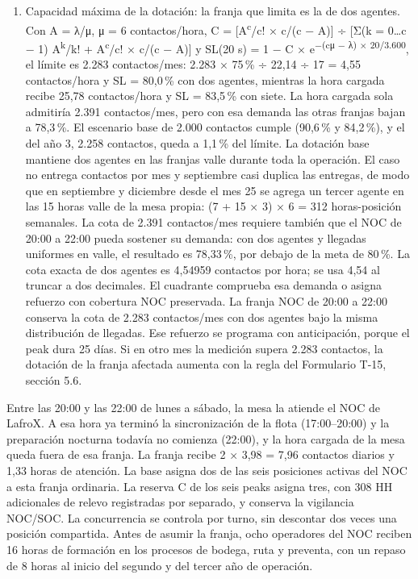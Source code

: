 \begin{enumerate}
  \item Capacidad máxima de la dotación: la franja que limita es la de dos agentes. Con A = λ/μ, μ = 6 contactos/hora, C = [A\textsuperscript{c}/c! × c/(c − A)] ÷ [Σ(k = 0…c − 1) A\textsuperscript{k}/k! + A\textsuperscript{c}/c! × c/(c − A)] y SL(20 s) = 1 − C × e\textsuperscript{−(cμ − λ) × 20/3.600}, el límite es 2.283 contactos/mes: 2.283 × 75\,\% ÷ 22,14 ÷ 17 = 4,55 contactos/hora y SL = 80,0\,\% con dos agentes, mientras la hora cargada recibe 25,78 contactos/hora y SL = 83,5\,\% con siete. La hora cargada sola admitiría 2.391 contactos/mes, pero con esa demanda las otras franjas bajan a 78,3\,\%. El escenario base de 2.000 contactos cumple (90,6\,\% y 84,2\,\%), y el del año 3, 2.258 contactos, queda a 1,1\,\% del límite. La dotación base mantiene dos agentes en las franjas valle durante toda la operación. El caso no entrega contactos por mes y septiembre casi duplica las entregas, de modo que en septiembre y diciembre desde el mes 25 se agrega un tercer agente en las 15 horas valle de la mesa propia: (7 + 15 × 3) × 6 = 312 horas-posición semanales. La cota de 2.391 contactos/mes requiere también que el NOC de 20:00 a 22:00 pueda sostener su demanda: con dos agentes y llegadas uniformes en valle, el resultado es 78,33\,\%, por debajo de la meta de 80\,\%. La cota exacta de dos agentes es 4,54959 contactos por hora; se usa 4,54 al truncar a dos decimales. El cuadrante comprueba esa demanda o asigna refuerzo con cobertura NOC preservada. La franja NOC de 20:00 a 22:00 conserva la cota de 2.283 contactos/mes con dos agentes bajo la misma distribución de llegadas. Ese refuerzo se programa con anticipación, porque el peak dura 25 días. Si en otro mes la medición supera 2.283 contactos, la dotación de la franja afectada aumenta con la regla del Formulario T-15, sección 5.6.
\end{enumerate}

Entre las 20:00 y las 22:00 de lunes a sábado, la mesa la atiende el NOC de LafroX. A esa hora ya terminó la sincronización de la flota (17:00--20:00) y la preparación nocturna todavía no comienza (22:00), y la hora cargada de la mesa queda fuera de esa franja. La franja recibe 2 × 3,98 = 7,96 contactos diarios y 1,33 horas de atención. La base asigna dos de las seis posiciones activas del NOC a esta franja ordinaria. La reserva C de los seis peaks asigna tres, con 308 HH adicionales de relevo registradas por separado, y conserva la vigilancia NOC/SOC. La concurrencia se controla por turno, sin descontar dos veces una posición compartida. Antes de asumir la franja, ocho operadores del NOC reciben 16 horas de formación en los procesos de bodega, ruta y preventa, con un repaso de 8 horas al inicio del segundo y del tercer año de operación.

